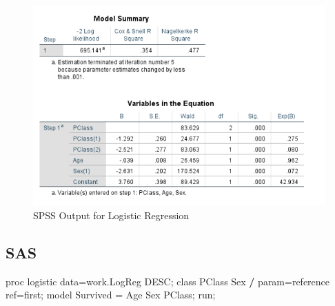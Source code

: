 \documentclass[
]{book}
\newenvironment{Shaded}{\begin{snugshade}}{\end{snugshade}}
\newcommand{\NormalTok}[1]{#1}
\newcommand{\OperatorTok}[1]{\textcolor[rgb]{0.81,0.36,0.00}{\textbf{#1}}}
\newcommand{\StringTok}[1]{\textcolor[rgb]{0.31,0.60,0.02}{#1}}
\begin{document}
\begin{figure}[!h]
\includegraphics{Screenshots/Logistic Regression/LogRegSPSS} \caption{\label{fig:LogRegSPSS}SPSS Output for Logistic Regression}\label{fig:LogRegSPSS}
\end{figure}

\hypertarget{sas-2}{%
\subsection{SAS}\label{sas-2}}

\begin{Shaded}
\begin{Highlighting}[]
\NormalTok{proc logistic data=work.LogReg DESC;}
\NormalTok{  class PClass Sex }\OperatorTok{/}\StringTok{ }\NormalTok{param=reference ref=first;}
\NormalTok{  model Survived =}\StringTok{ }\NormalTok{Age Sex PClass; }
\NormalTok{run;}
\end{Highlighting}
\end{Shaded}
\end{document}
